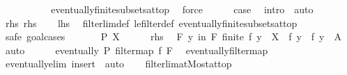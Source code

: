 \begin{isabellebody}
\ \ \ \ \ \ \isamarkupfalse%
\ {}\ \isamarkupfalse%
\ eventually{\isacharunderscore}{\kern0pt}finite{\isacharunderscore}{\kern0pt}subsets{\isacharunderscore}{\kern0pt}at{\isacharunderscore}{\kern0pt}top\ \isamarkupfalse%
\ force\isanewline
\ \ \ \ \isamarkupfalse%
\ {\isacharquery}{\kern0pt}case\ \isamarkupfalse%
\ {\isacharparenleft}{\kern0pt}intro\ {\isacharasterisk}{\kern0pt}{\isacharparenright}{\kern0pt}\ auto\isanewline
\ \ \isamarkupfalse%
\isanewline
{}\isamarkupfalse%
\isanewline
\ \ \isamarkupfalse%
\ rhs{\isacharcolon}{\kern0pt}\ {\isacharquery}{\kern0pt}rhs\isanewline
\ \ \isamarkupfalse%
\ {\isacharquery}{\kern0pt}lhs\ \isamarkupfalse%
\ filterlim{\isacharunderscore}{\kern0pt}def\ le{\isacharunderscore}{\kern0pt}filter{\isacharunderscore}{\kern0pt}def\ eventually{\isacharunderscore}{\kern0pt}finite{\isacharunderscore}{\kern0pt}subsets{\isacharunderscore}{\kern0pt}at{\isacharunderscore}{\kern0pt}top\isanewline
\ \ \isamarkupfalse%
\ {\isacharparenleft}{\kern0pt}safe{\isacharcomma}{\kern0pt}\ goal{\isacharunderscore}{\kern0pt}cases{\isacharparenright}{\kern0pt}\isanewline
\ \ \ \ \isamarkupfalse%
\ {\isacharparenleft}{\kern0pt}{}\ P\ X{\isacharparenright}{\kern0pt}\isanewline
\ \ \ \ \isamarkupfalse%
\ rhs\ \isamarkupfalse%
\ {\isachardoublequoteopen}{\isasymforall}\isactrlsub F\ y\ in\ F{\isachardot}{\kern0pt}\ finite\ {\isacharparenleft}{\kern0pt}f\ y{\isacharparenright}{\kern0pt}\ {\isasymand}\ X\ {\isasymsubseteq}\ f\ y\ {\isasymand}\ f\ y\ {\isasymsubseteq}\ A{\isachardoublequoteclose}\ \isamarkupfalse%
\ auto\isanewline
\ \ \ \ \isamarkupfalse%
\ {\isachardoublequoteopen}eventually\ P\ {\isacharparenleft}{\kern0pt}filtermap\ f\ F{\isacharparenright}{\kern0pt}{\isachardoublequoteclose}\ \isamarkupfalse%
\ eventually{\isacharunderscore}{\kern0pt}filtermap\isanewline
\ \ \ \ \ \ \isamarkupfalse%
\ eventually{\isacharunderscore}{\kern0pt}elim\ {\isacharparenleft}{\kern0pt}insert\ {}{\isacharcomma}{\kern0pt}\ auto{\isacharparenright}{\kern0pt}\isanewline
\ \ \isamarkupfalse%
\isanewline
{}\isamarkupfalse%
%
\endisatagproof
{\isafoldproof}%
%
\isadelimproof
\isanewline
%
\endisadelimproof
\isanewline
{}\isamarkupfalse%
\ filterlim{\isacharunderscore}{\kern0pt}atMost{\isacharunderscore}{\kern0pt}at{\isacharunderscore}{\kern0pt}top{\isacharcolon}{\kern0pt}\isanewline

\end{isabellebody}
